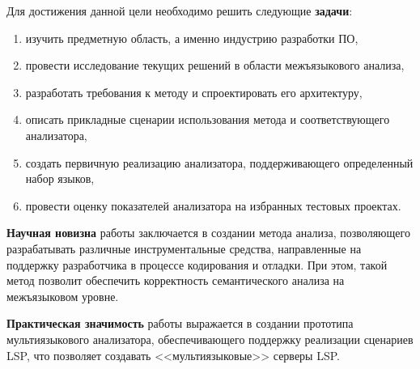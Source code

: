 Для достижения данной цели необходимо решить следующие \textbf{задачи}:
\begin{enumerate}[1)]
    \item изучить предметную область, а именно индустрию разработки ПО,
    \item провести исследование текущих решений в области межъязыкового анализа,
    \item разработать требования к методу и спроектировать его архитектуру,
    \item описать прикладные сценарии использования метода и соответствующего анализатора,
    \item создать первичную реализацию анализатора, поддерживающего определенный набор языков,
    \item провести оценку показателей анализатора на избранных тестовых проектах.
\end{enumerate}

\textbf{Научная новизна} работы заключается в создании метода анализа, позволяющего
разрабатывать различные инструментальные средства, направленные
на поддержку разработчика в процессе кодирования и отладки. При этом, такой метод позволит
обеспечить корректность семантического анализа на межъязыковом уровне.

\textbf{Практическая значимость} работы выражается в создании прототипа мультиязыкового
анализатора, обеспечивающего поддержку реализации сценариев LSP, что позволяет
создавать <<мультиязыковые>> серверы LSP.

